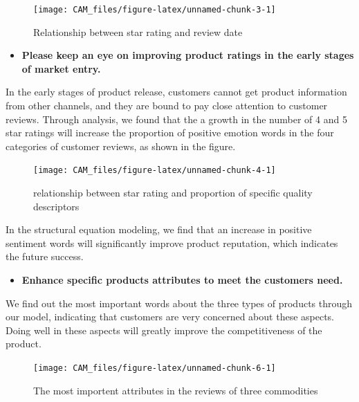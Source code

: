 \documentclass[12pt,a4paper,]{article}
\providecommand{\tightlist}{%
  \setlength{\itemsep}{0pt}\setlength{\parskip}{0pt}}
\begin{document}
\begin{figure}

{\centering \texttt{[image: CAM\_files/figure-latex/unnamed-chunk-3-1]} 

}

\caption{Relationship between star rating and review date}\label{fig:unnamed-chunk-3}
\end{figure}

\begin{itemize}
\tightlist
\item
  \textbf{Please keep an eye on improving product ratings in the early
  stages of market entry.}
\end{itemize}

In the early stages of product release, customers cannot get product
information from other channels, and they are bound to pay close
attention to customer reviews. Through analysis, we found that the a
growth in the number of 4 and 5 star ratings will increase the
proportion of positive emotion words in the four categories of customer
reviews, as shown in the figure.

\begin{figure}

{\centering \texttt{[image: CAM\_files/figure-latex/unnamed-chunk-4-1]} 

}

\caption{relationship between star rating and proportion of specific quality descriptors}\label{fig:unnamed-chunk-4}
\end{figure}

In the structural equation modeling, we find that an increase in
positive sentiment words will significantly improve product reputation,
which indicates the future success.

\begin{itemize}
\tightlist
\item
  \textbf{Enhance specific products attributes to meet the customers
  need.}
\end{itemize}

We find out the most important words about the three types of products
through our model, indicating that customers are very concerned about
these aspects. Doing well in these aspects will greatly improve the
competitiveness of the product.

\begin{figure}
\texttt{[image: CAM\_files/figure-latex/unnamed-chunk-6-1]} \caption{The most importent attributes in the reviews of three commodities}\label{fig:unnamed-chunk-6}
\end{figure}
\end{document}

